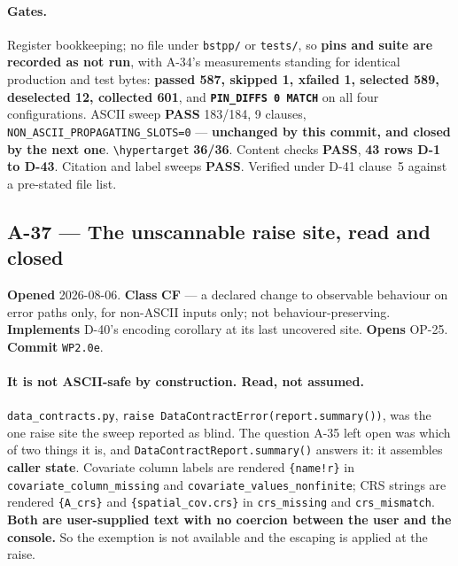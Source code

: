 \documentclass[
  10pt,
]{article}
\begin{document}
\paragraph{Gates.}
Register bookkeeping; no file under \texttt{bstpp/} or \texttt{tests/}, so \textbf{pins and suite are recorded as not run}, with A-34's measurements standing for identical production and test bytes: \textbf{passed 587, skipped 1, xfailed 1, selected 589, deselected 12, collected 601}, and \textbf{\texttt{PIN\_DIFFS 0 MATCH}} on all four configurations. ASCII sweep \textbf{PASS} 183/184, 9 clauses, \texttt{NON\_ASCII\_PROPAGATING\_SLOTS=0} --- \textbf{unchanged by this commit, and closed by the next one}. \texttt{\textbackslash hypertarget} \textbf{36/36}. Content checks \textbf{PASS}, \textbf{43 rows D-1 to D-43}. Citation and label sweeps \textbf{PASS}. Verified under D-41 clause~5 against a pre-stated file list.

\hypertarget{a-37}{%
\subsection{A-37 --- The unscannable raise site, read and closed}\label{a-37}}

\textbf{Opened} 2026-08-06. \textbf{Class} \textbf{CF} --- a declared change to observable behaviour on error paths only, for non-ASCII inputs only; not behaviour-preserving. \textbf{Implements} D-40's encoding corollary at its last uncovered site. \textbf{Opens} OP-25. \textbf{Commit} \texttt{WP2.0e}.

\paragraph{It is not ASCII-safe by construction. Read, not assumed.}
\texttt{data\_contracts.py}, \texttt{raise DataContractError(report.\allowbreak{}summary())}, was the one raise site the sweep reported as blind. The question A-35 left open was which of two things it is, and \texttt{DataContractReport.summary()} answers it: it assembles \textbf{caller state}. Covariate column labels are rendered \texttt{\{name!r\}} in \texttt{covariate\_column\_missing} and \texttt{covariate\_values\_nonfinite}; CRS strings are rendered \texttt{\{A\_crs\}} and \texttt{\{spatial\_cov.crs\}} in \texttt{crs\_missing} and \texttt{crs\_mismatch}. \textbf{Both are user-supplied text with no coercion between the user and the console.} So the exemption is not available and the escaping is applied at the raise.
\end{document}
